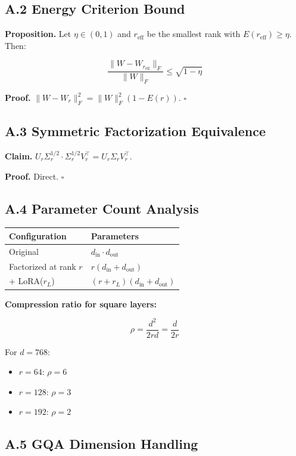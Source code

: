 \subsection{A.2 Energy Criterion Bound}

\textbf{Proposition.} Let $\eta \in (0, 1)$ and $r_\text{eff}$ be the smallest 
rank with $E(r_\text{eff}) \geq \eta$. Then:

\[
\frac{\|W - W_{r_\text{eff}}\|_F}{\|W\|_F} \leq \sqrt{1 - \eta}
\tag{A.2}
\]

\textbf{Proof.} $\|W - W_r\|_F^2 = \|W\|_F^2(1 - E(r))$. $\square$

\subsection{A.3 Symmetric Factorization Equivalence}

\textbf{Claim.} $U_r \Sigma_r^{1/2} \cdot \Sigma_r^{1/2} V_r^\top = U_r \Sigma_r V_r^\top$.

\textbf{Proof.} Direct. $\square$

\subsection{A.4 Parameter Count Analysis}

\begin{table}[H]
\centering
\small
\begin{tabular}{ll}
\toprule
\textbf{Configuration} & \textbf{Parameters} \\
\midrule
Original & $d_\text{in} \cdot d_\text{out}$ \\
Factorized at rank $r$ & $r(d_\text{in} + d_\text{out})$ \\
+ LoRA($r_L$) & $(r + r_L)(d_\text{in} + d_\text{out})$ \\
\bottomrule
\end{tabular}
\end{table}

\textbf{Compression ratio for square layers:}

\[
\rho = \frac{d^2}{2rd} = \frac{d}{2r}
\tag{A.3}
\]

For $d = 768$:
\begin{itemize}
\item $r = 64$: $\rho = 6$
\item $r = 128$: $\rho = 3$
\item $r = 192$: $\rho = 2$

\end{itemize}
\subsection{A.5 GQA Dimension Handling}


